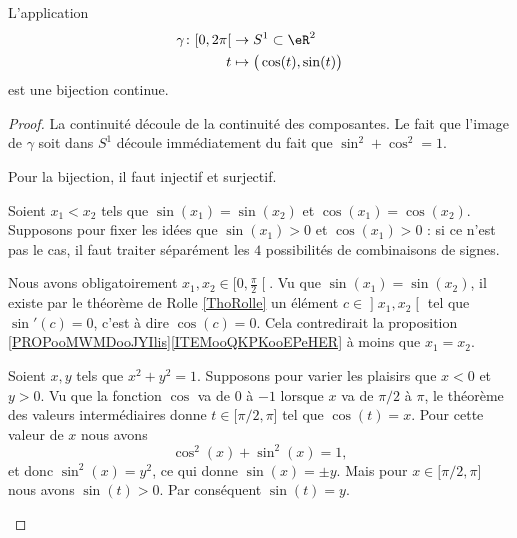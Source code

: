 \begin{proposition}     \label{PROPooKSGXooOqGyZj}
    L'application
    \begin{equation}
        \begin{aligned}
            \gamma\colon \mathopen[ 0 , 2\pi \mathclose[&\to S^1\subset \eR^2 \\
            t&\mapsto \big( \cos(t),\sin(t) \big) 
        \end{aligned}
    \end{equation}
    est une bijection continue.
\end{proposition}

\begin{proof}
    La continuité découle de la continuité des composantes. Le fait que l'image de \( \gamma\) soit dans \( S^1\) découle immédiatement du fait que \( \sin^2+\cos^2=1\).

    Pour la bijection, il faut injectif et surjectif.
    \begin{subproof}
        \item[Injectif]
            Soient \( x_1<x_2\) tels que \( \sin(x_1)=\sin(x_2)\) et \( \cos(x_1)=\cos(x_2)\). Supposons pour fixer les idées que \( \sin(x_1)>0\) et \( \cos(x_1)>0\) : si ce n'est pas le cas, il faut traiter séparément les \( 4\) possibilités de combinaisons de signes.

            Nous avons obligatoirement \( x_1,x_2\in\mathopen[ 0 , \frac{ \pi }{ 2 } \mathclose[\). Vu que \( \sin(x_1)=\sin(x_2)\), il existe par le théorème de Rolle \ref{ThoRolle} un élément \( c\in \mathopen] x_1 , x_2 \mathclose[\) tel que \( \sin'(c)=0\), c'est à dire \( \cos(c)=0\). Cela contredirait la proposition \ref{PROPooMWMDooJYIlis}\ref{ITEMooQKPKooEPeHER} à moins que \( x_1=x_2\).

            \item[Surjectif]

                Soient \( x,y\) tels que \( x^2+y^2=1\). Supposons pour varier les plaisirs que \( x<0\) et \( y>0\). Vu que la fonction \( \cos\) va de \( 0\) à \( -1\) lorsque \( x\) va de \( \pi/2\) à \( \pi\), le théorème des valeurs intermédiaires donne \( t\in\mathopen[ \pi/2 , \pi \mathclose]\) tel que \( \cos(t)=x\). Pour cette valeur de \( x\) nous avons
                \begin{equation}
                    \cos^2(x)+\sin^2(x)=1,
                \end{equation}
                et donc \( \sin^2(x)=y^2\), ce qui donne \( \sin(x)=\pm y\). Mais pour \( x\in \mathopen[ \pi/2 , \pi \mathclose]\) nous avons \( \sin(t)>0\). Par conséquent \( \sin(t)=y\).
    \end{subproof}
\end{proof}

